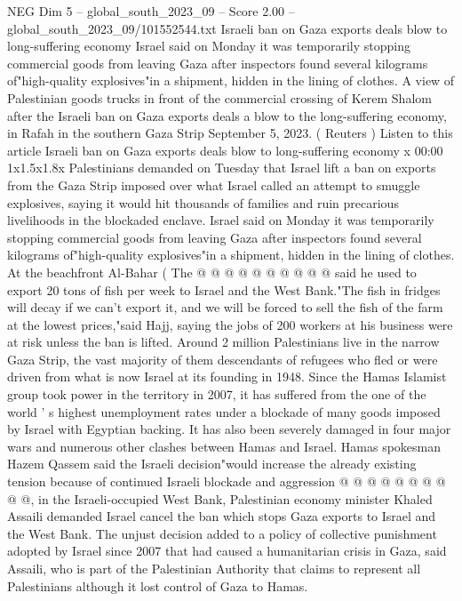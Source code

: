 \begin{textsample}{NEG Dim 5 – global\_south\_2023\_09 – Score 2.00 – global\_south\_2023\_09/101552544.txt}  \label{ex:f5_neg_004}
Israeli ban on Gaza exports deals blow to long-suffering economy Israel said on Monday it was temporarily stopping commercial goods from leaving Gaza after inspectors found several kilograms of"high-quality explosives"in a shipment, hidden in the lining of clothes.
A view of Palestinian goods trucks in front of the commercial crossing of Kerem Shalom after the Israeli ban on Gaza exports deals a blow to the long-suffering economy, in Rafah in the southern Gaza Strip September 5, 2023. ( Reuters ) Listen to this article Israeli ban on Gaza exports deals blow to long-suffering economy x 00:00 1x1.5x1.8x Palestinians demanded on Tuesday that Israel lift a ban on exports from the Gaza Strip imposed over what Israel called an attempt to smuggle explosives, saying it would hit thousands of families and ruin precarious livelihoods in the blockaded enclave.
Israel said on Monday it was temporarily stopping commercial goods from leaving Gaza after inspectors found several kilograms of"high-quality explosives"in a shipment, hidden in the lining of clothes.
At the beachfront Al-Bahar ( The @ @ @ @ @ @ @ @ @ @ said he used to export 20 tons of fish per week to Israel and the West Bank."The fish in fridges will decay if we can't export it, and we will be forced to sell the fish of the farm at the lowest prices,"said Hajj, saying the jobs of 200 workers at his business were at risk unless the ban is lifted.
Around 2 million Palestinians live in the narrow Gaza Strip, the vast majority of them descendants of refugees who fled or were driven from what is now Israel at its founding in 1948.
Since the Hamas Islamist group took power in the territory in 2007, it has suffered from the one of the world ' s highest unemployment rates under a blockade of many goods imposed by Israel with Egyptian backing.
It has also been severely damaged in four major wars and numerous other clashes between Hamas and Israel.
Hamas spokesman Hazem Qassem said the Israeli decision"would increase the already existing tension because of continued Israeli blockade and aggression @ @ @ @ @ @ @ @ @ @, in the Israeli-occupied West Bank, Palestinian economy minister Khaled Assaili demanded Israel cancel the ban which stops Gaza exports to Israel and the West Bank.
The unjust decision added to a policy of collective punishment adopted by Israel since 2007 that had caused a humanitarian crisis in Gaza, said Assaili, who is part of the Palestinian Authority that claims to represent all Palestinians although it lost control of Gaza to Hamas.

\end{textsample}
